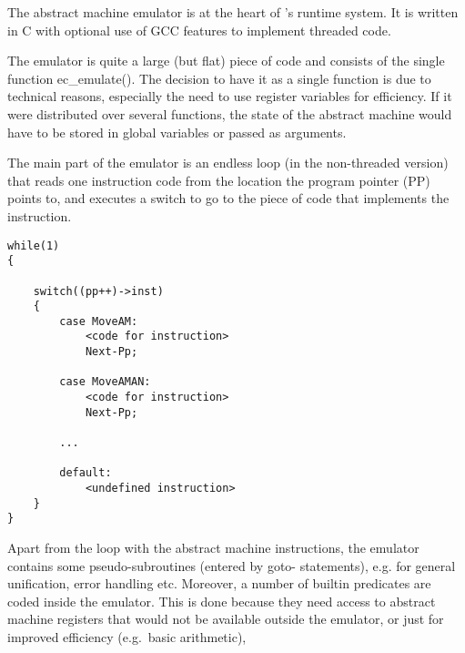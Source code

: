 The abstract machine  emulator  is at the heart of \eclipse's runtime system. 
It is written in C with optional use of GCC features to implement
threaded code.

The emulator is quite a large (but flat) piece of code and consists of the single
function ec_emulate().  The decision to have it as a single function
is due to technical reasons, especially the need to use register
variables for efficiency.  If it were distributed over several
functions, the state of the abstract machine would have to be stored
in global variables or passed as arguments.

The main part of the emulator is an endless loop (in the non-threaded
version) that reads one instruction code from the location the program
pointer (PP) points to, and executes a switch to go to the piece of
code that implements the instruction.
\begin{small}
\begin{verbatim}
while(1)
{

    switch((pp++)->inst)
    {
        case MoveAM:
            <code for instruction>
            Next-Pp;

        case MoveAMAN:
            <code for instruction>
            Next-Pp;

        ...

        default:
            <undefined instruction>
    }
}
\end{verbatim}
\end{small}
Apart from the loop with the abstract machine instructions, the
emulator contains some pseudo-subroutines (entered by goto-
statements), e.g. for general unification, error handling etc. 
Moreover, a number of builtin predicates are coded inside the emulator. 
This is done because they need access to abstract machine registers
that would not be available outside the emulator, or just for improved
efficiency (e.g.\ basic arithmetic),

%

